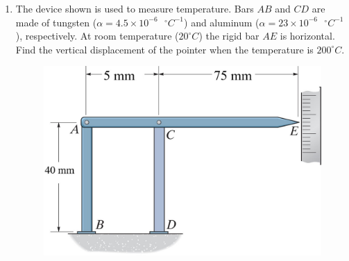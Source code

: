 \documentclass[12pt, oneside]{article}
\begin{document}
\begin{enumerate}
	\item %
		The device shown is used to measure temperature.
		Bars $AB$ and $CD$ are made of tungsten ($\alpha = 4.5 \times 10^{-6} \text{ } ^\circ C^{-1}$) and aluminum ($\alpha = 23 \times 10^{-6} \text{ } ^\circ C^{-1}$), respectively.
		At room temperature ($20^\circ C$) the rigid bar $AE$ is horizontal.
		Find the vertical displacement of the pointer when the temperature is $200 ^\circ C$.
		\begin{figure}[H]
			\centering
			\includegraphics[width=0.8\linewidth]{4-76}
		\end{figure}

\end{enumerate}
\end{document}
